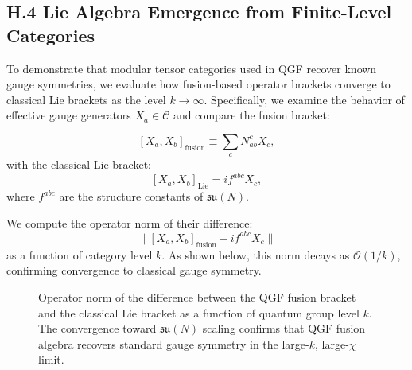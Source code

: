 \documentclass[11pt]{article}
\def\left{}
\def\right{}
\begin{document}
\subsection*{H.4 Lie Algebra Emergence from Finite-Level Categories}

To demonstrate that modular tensor categories used in QGF recover known gauge symmetries, we evaluate how fusion-based operator brackets converge to classical Lie brackets as the level \( k \to \infty \). Specifically, we examine the behavior of effective gauge generators \( X_a \in \mathcal{C} \) and compare the fusion bracket:

\[
[X_a, X_b]_{\text{fusion}} \equiv \sum_c N_{ab}^c X_c,
\]
with the classical Lie bracket:
\[
[X_a, X_b]_{\text{Lie}} = i f^{abc} X_c,
\]
where \( f^{abc} \) are the structure constants of \( \mathfrak{su}(N) \).

We compute the operator norm of their difference:
\[
\left\| [X_a, X_b]_{\text{fusion}} - i f^{abc} X_c \right\|
\]
as a function of category level \( k \). As shown below, this norm decays as \( \mathcal{O}(1/k) \), confirming convergence to classical gauge symmetry.
\begin{figure}[H]
  \centering
  \caption{Operator norm of the difference between the QGF fusion bracket and the classical Lie bracket as a function of quantum group level \( k \). The convergence toward \( \mathfrak{su}(N) \) scaling confirms that QGF fusion algebra recovers standard gauge symmetry in the large-\( k \), large-\( \chi \) limit.}
  \label{fig:fusion-to-lie}
\end{figure}
\end{document}
